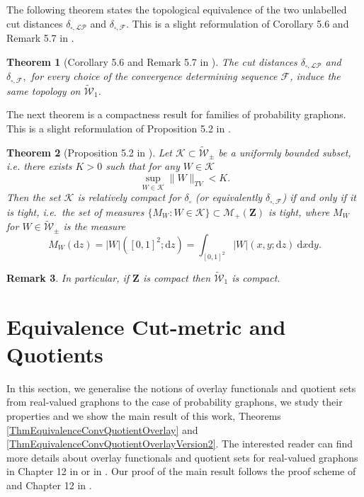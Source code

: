 \documentclass[11pt]{article}
\newtheorem{theorem}{Theorem}[section]
\newtheorem{remark}[theorem]{Remark}
\newcommand{\cF}{{\mathcal F}}  %
\newcommand{\cK}{{\mathcal K}}  %
\newcommand{\Space}{\mathbf{Z}}
\newcommand{\signed}{\pm}
\newcommand{\Meas}{\mathcal{M}_+(\Space)}
\newcommand{\UGraphon}{\widetilde{\mathcal{W}}_1}
\newcommand{\UKernel}{\widetilde{\mathcal{W}}_{\signed}}
\newcommand{\F}{\mathcal{F}}
\newcommand{\drv}{\mathrm{d}}
\begin{document}
The following theorem states the topological equivalence of the two unlabelled cut distances $\delta_{\square,\mathcal{LP}}$ and $\delta_{\square,\cF}.$ This is a slight reformulation of Corollary 5.6 and Remark 5.7 in \cite{abraham2023probabilitygraphons}.


\begin{theorem}[Corollary 5.6 and Remark 5.7 in \cite{abraham2023probabilitygraphons}]
	\label{cor:equiv-topo}
The cut distances $\delta_{\square,\mathcal{LP}}$ and $\delta_{\square,\cF},$ for every choice of the convergence determining sequence $\F$, induce the same topology  on  $\UGraphon$. 
\end{theorem}

The next theorem is a compactness result for families of probability graphons. This is a slight reformulation of Proposition 5.2 in \cite{abraham2023probabilitygraphons}.


\begin{theorem}[Proposition 5.2 in \cite{abraham2023probabilitygraphons}]\label{ThmRelCompact}
Let $\cK\subset \UKernel$ be a uniformly bounded subset, i.e. there exists $K>0$ such that for any $W\in \cK$$$\sup_{W\in \cK}\|W\|_{TV}<K.$$ Then the set $\cK$ is relatively compact for $\delta_{\square}$ (or equivalently $\delta_{\square,\cF}$) if and only if it is tight, i.e.\ the set of measures $\{ M_W : W\in\mathcal{K} \} \subset \Meas$ is tight, where $M_W$ for $W\in \UKernel$ is the measure
\begin{equation}
  \label{eq:def-MW}
M_W(\drv z) 
= \vert W \vert ([0,1]^2; \drv z)
= \int_{[0,1]^2} \vert W\vert (x,y;\drv z) \ \drv x \drv y.
\end{equation}
\end{theorem}
\begin{remark}
In particular, if $\Space$ is compact then $\UGraphon$ is compact. 
\end{remark}


\section{Equivalence Cut-metric and Quotients}\label{Sec4Results}

In this section, we generalise the notions of overlay functionals and quotient sets from real-valued graphons to the case of probability graphons, we study their properties and we show the main result of this work, Theorems \ref{ThmEquivalenceConvQuotientOverlay} and \ref{ThmEquivalenceConvQuotientOverlayVersion2}. The interested reader can find more details about overlay functionals and quotient sets for real-valued graphons in Chapter 12 in \cite{LovaszGraphLimits} or in \cite{borgs2011convergentAnnals}. Our proof of the main result follows the proof scheme of \cite{borgs2011convergentAnnals} and Chapter 12 in \cite{LovaszGraphLimits}.
\end{document}
